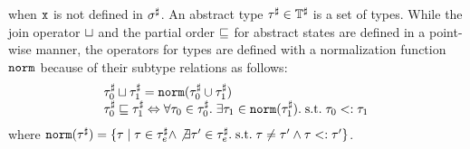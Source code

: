 when $\texttt{x}$ is not defined in ${\sigma}^\sharp$.  An abstract type $\tau^\sharp \in \mathbb{T}^\sharp$ is a
set of types.  While the join operator $\sqcup$ and the partial order $\sqsubseteq$
for abstract states are defined in a point-wise manner, the operators for types
are defined with a normalization function $\mathtt{norm}$ because of their subtype
relations as follows:
\[
  \begin{array}{l}
    \tau^\sharp_0 \sqcup \tau^\sharp_1 = \mathtt{norm}(\tau^\sharp_0 \cup \tau^\sharp_1)\\
    \tau^\sharp_0 \sqsubseteq \tau^\sharp_1 \Leftrightarrow \forall \tau_0 \in \tau^\sharp_0. \; \exists
    \tau_1 \in \mathtt{norm}(\tau^\sharp_1). \; \text{s.t.} \; \tau_0 <: \tau_1\\
  \end{array}
\]
where $\mathtt{norm}(\tau^\sharp) = \{ \tau \mid \tau \in \tau^\sharp_e \wedge \not\exists \tau' \in
\tau^\sharp_e. \; \text{s.t.} \; \tau \neq \tau' \wedge \tau <: \tau' \}$.

